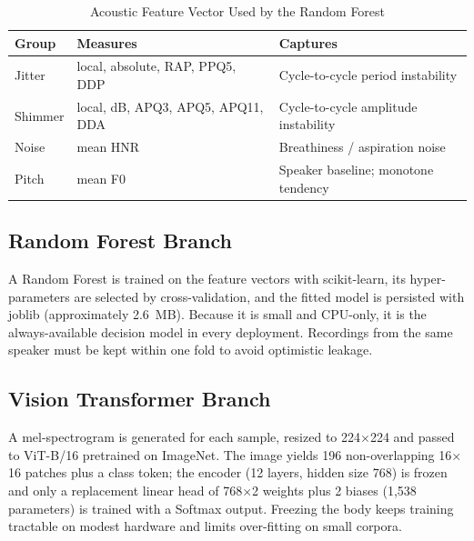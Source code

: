 \begin{table}[!t]
\caption{Acoustic Feature Vector Used by the Random Forest}
\centering\footnotesize
\begin{tabularx}{\columnwidth}{@{}l>{\raggedright\arraybackslash}X>{\raggedright\arraybackslash}X@{}}
\toprule
\textbf{Group} & \textbf{Measures} & \textbf{Captures}\\\midrule
Jitter & local, absolute, RAP, PPQ5, DDP & Cycle-to-cycle period instability\\
Shimmer & local, dB, APQ3, APQ5, APQ11, DDA & Cycle-to-cycle amplitude instability\\
Noise & mean HNR & Breathiness / aspiration noise\\
Pitch & mean F0 & Speaker baseline; monotone tendency\\\bottomrule
\end{tabularx}
\end{table}

\subsection{Random Forest Branch}
A Random Forest is trained on the feature vectors with scikit-learn, its hyper-parameters are selected by cross-validation, and the fitted model is persisted with joblib (approximately 2.6~MB). Because it is small and CPU-only, it is the always-available decision model in every deployment. Recordings from the same speaker must be kept within one fold to avoid optimistic leakage.

\subsection{Vision Transformer Branch}
A mel-spectrogram is generated for each sample, resized to 224$\times$224 and passed to ViT-B/16 pretrained on ImageNet. The image yields 196 non-overlapping 16$\times$16 patches plus a class token; the encoder (12 layers, hidden size 768) is frozen and only a replacement linear head of 768$\times$2 weights plus 2 biases (1,538 parameters) is trained with a Softmax output. Freezing the body keeps training tractable on modest hardware and limits over-fitting on small corpora.

